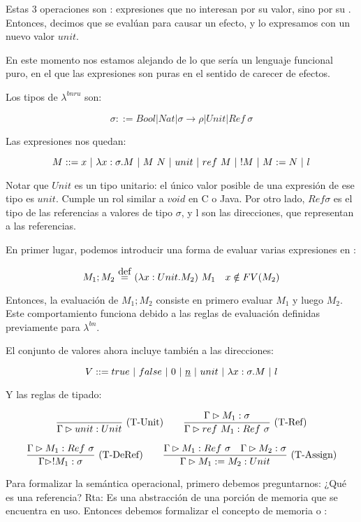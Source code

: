 Estas 3 operaciones son : expresiones que no interesan por su valor, sino por su . Entonces, decimos que se evalúan para causar un efecto, y lo expresamos con un nuevo valor $unit$.

En este momento nos estamos alejando de lo que sería un lenguaje funcional puro, en el que las expresiones son puras en el sentido de carecer de efectos.

Los tipos de $\lambda^{bnru}$ son:

\[\sigma ::= Bool \vert Nat \vert \sigma\to\rho \vert Unit \vert Ref\ \sigma \]

Las expresiones nos quedan:

\[M ::= x \ |\  \lambda x:\sigma.M \ |\  M\ N \ |\  unit \ |\  ref\ M \ |\  !M \ |\  M := N \ |\  l \]

Notar que $Unit$ es un tipo unitario: el único valor posible de una expresión de ese tipo es $unit$. Cumple un rol similar a $void$ en C o Java. Por otro lado, $Ref \sigma$ es el tipo de las referencias a valores de tipo $\sigma$, y l son las direcciones, que representan a las referencias.

En primer lugar, podemos introducir una forma de evaluar varias expresiones en :

\[M_1; M_2 \eqdef \app{(\abs{x}{Unit}{M_2})}{M_1}\quad x\notin FV(M_2)\]

Entonces, la evaluación de $M_1; M_2$ consiste en primero evaluar $M_1$  y luego $M_2$. Este comportamiento funciona debido a las reglas de evaluación definidas previamente para $\lambda^{bn}$.

El conjunto de valores ahora incluye también a las direcciones:

\[V ::= true \ |\  false \ |\  0 \ |\  \underline{n} \ |\  unit \ |\  \lambda x:\sigma.M \ |\  l \]

Y las reglas de tipado:

\[\deriv{}{\Gamma \rhd unit : Unit}{T-Unit}\quad\quad \deriv{\Gtipa{M_1}{\sigma}}{\Gtipa{ref\ M_1}{Ref\ \sigma}}{T-Ref}\]

\[\deriv{\Gtipa{M_1}{Ref\ \sigma}}{\Gtipa{!M_1}{\sigma}}{T-DeRef}\quad\quad \deriv{\Gtipa{M_1}{Ref\ \sigma}\quad \Gtipa{M_2}{\sigma}}{\Gtipa{M_1 := M_2}{Unit}}{T-Assign}\]

Para formalizar la semántica operacional, primero debemos preguntarnos: ¿Qué es una referencia? Rta: Es una abstracción de una porción de memoria que se encuentra en uso. Entonces debemos formalizar el concepto de memoria o :

